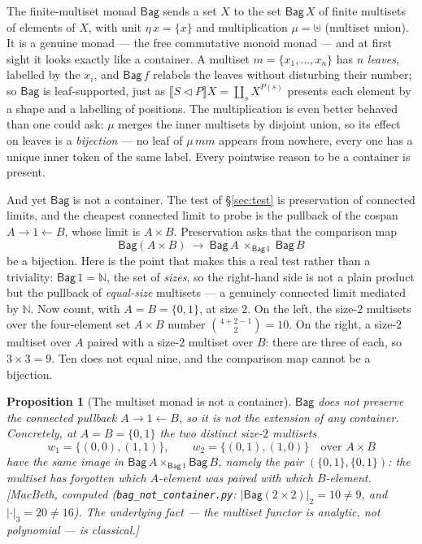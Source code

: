 \documentclass[11pt,a4paper]{book}
\newcommand{\cont}[2]{#1 \triangleleft #2}
\newcommand{\Ext}[1]{\llbracket #1 \rrbracket}
\theoremstyle{plain}
\newtheorem{Proposition}[Theorem]{Proposition}
\theoremstyle{definition}
\theoremstyle{remark}
\newcommand{\prov}[1]{\hfill\textsf{\footnotesize[#1]}}
\begin{document}
The finite-multiset monad $\mathsf{Bag}$ sends a set $X$ to the set $\mathsf{Bag}\,X$ of
finite multisets of elements of $X$, with unit $\eta\,x=\{x\}$ and multiplication
$\mu=\uplus$ (multiset union). It is a genuine monad --- the free commutative monoid
monad --- and at first sight it looks exactly like a container. A multiset
$m=\{x_{1},\dots,x_{n}\}$ has $n$ \emph{leaves}, labelled by the $x_{i}$, and
$\mathsf{Bag}\,f$ relabels the leaves without disturbing their number; so $\mathsf{Bag}$
is leaf-supported, just as $\Ext{\cont SP}X=\coprod_{s}X^{P(s)}$ presents each element by
a shape and a labelling of positions. The multiplication is even better behaved than one
could ask: $\mu$ merges the inner multisets by disjoint union, so its effect on leaves is
a \emph{bijection} --- no leaf of $\mu\,mm$ appears from nowhere, every one has a unique
inner token of the same label. Every pointwise reason to be a container is present.

And yet $\mathsf{Bag}$ is not a container. The test of \S\ref{sec:test} is preservation of
connected limits, and the cheapest connected limit to probe is the pullback of the cospan
$A\to 1\leftarrow B$, whose limit is $A\times B$. Preservation asks that the comparison map
\[
  \mathsf{Bag}(A\times B)\ \longrightarrow\ \mathsf{Bag}\,A\ \times_{\mathsf{Bag}\,1}\ \mathsf{Bag}\,B
\]
be a bijection. Here is the point that makes this a real test rather than a triviality:
$\mathsf{Bag}\,1=\mathbb N$, the set of \emph{sizes}, so the right-hand side is not a plain
product but the pullback of \emph{equal-size} multisets --- a genuinely connected limit
mediated by $\mathbb N$. Now count, with $A=B=\{0,1\}$, at size $2$. On the left, the
size-$2$ multisets over the four-element set $A\times B$ number $\binom{4+2-1}{2}=10$. On
the right, a size-$2$ multiset over $A$ paired with a size-$2$ multiset over $B$: there are
three of each, so $3\times 3=9$. Ten does not equal nine, and the comparison map cannot be a
bijection.

\begin{Proposition}[The multiset monad is not a container]\label{prop:bag-not-container}
$\mathsf{Bag}$ does not preserve the connected pullback $A\to 1\leftarrow B$, so it is not
the extension of any container. Concretely, at $A=B=\{0,1\}$ the two distinct size-$2$
multisets
\[
  w_{1}=\{(0,0),(1,1)\},\qquad w_{2}=\{(0,1),(1,0)\}\quad\text{over }A\times B
\]
have the same image in $\mathsf{Bag}\,A\times_{\mathsf{Bag}\,1}\mathsf{Bag}\,B$, namely the
pair $(\{0,1\},\{0,1\})$: the multiset has forgotten \emph{which} $A$-element was paired
with \emph{which} $B$-element.
\prov{MacBeth, computed (\texttt{bag\_not\_container.py}: $\lvert\mathsf{Bag}(2\times
2)\rvert_{2}=10\neq 9$, and $\lvert\cdot\rvert_{3}=20\neq16$). The underlying fact --- the
multiset functor is analytic, not polynomial --- is classical.}
\end{Proposition}
\end{document}
